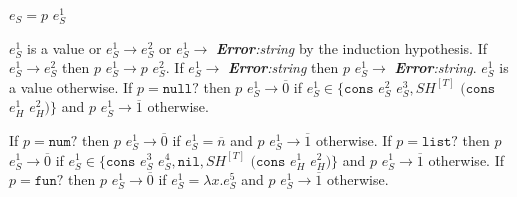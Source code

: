 \begin{case}
$e_{S}=p$ $e_{S}^{1}$

$e_{S}^{1}$ is a value or $e_{S}^{1}\rightarrow e_{S}^{2}$ or $e_{S}^{1}\rightarrow$ \emph{\textbf{Error}:\;string} by the induction hypothesis.  If $e_{S}^{1}\rightarrow e_{S}^{2}$ then $p$ $e_{S}^{1}\rightarrow p$ $e_{S}^{2}$.  If $e_{S}^{1}\rightarrow$ \emph{\textbf{Error}:\;string} then $p$ $e_{S}^{1}\rightarrow$ \emph{\textbf{Error}:\;string}.  $e_{S}^{1}$ is a value otherwise.  If $p=\mathtt{null?}$ then $p$ $e_{S}^{1}\rightarrow\overline{0}$ if $e_{S}^{1}\in\lbrace\mathtt{cons}$ $e_{S}^{2}$ $e_{S}^{3},SH^{[T]}$ $(\mathtt{cons}$ $e_{H}^{1}$ $e_{H}^{2})\rbrace$ and $p$ $e_{S}^{1}\rightarrow\overline{1}$ otherwise.

If $p=\mathtt{num?}$ then $p$ $e_{S}^{1}\rightarrow\overline{0}$ if $e_{S}^{1}=\overline{n}$ and $p$ $e_{S}^{1}\rightarrow\overline{1}$ otherwise.  If $p=\mathtt{list?}$ then $p$ $e_{S}^{1}\rightarrow\overline{0}$ if $e_{S}^{1}\in\lbrace\mathtt{cons}$ $e_{S}^{3}$ $e_{S}^{4},\mathtt{nil},SH^{[T]}$ $(\mathtt{cons}$ $e_{H}^{1}$ $e_{H}^{2})\rbrace$ and $p$ $e_{S}^{1}\rightarrow\overline{1}$ otherwise.  If $p=\mathtt{fun?}$ then $p$ $e_{S}^{1}\rightarrow\overline{0}$ if $e_{S}^{1}=\lambda x.e_{S}^{5}$ and $p$ $e_{S}^{1}\rightarrow\overline{1}$ otherwise.
\end{case}